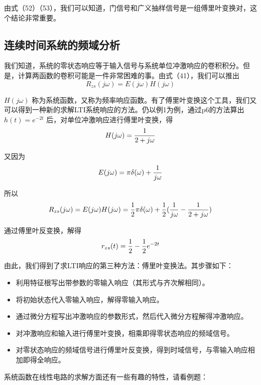 \documentclass[UTF8,a4paper,11pt]{article}
\begin{document}
由式（52）（53），我们可以知道，门信号和广义抽样信号是一组傅里叶变换对，这个结论非常重要。

\subsection{连续时间系统的频域分析}
我们知道，系统的零状态响应等于输入信号与系统单位冲激响应的卷积积分。但是，计算两函数的卷积可能是一件非常困难的事。由式（41），我们可以推出
\begin{equation}
R_{zs}(j\omega)=E(j\omega)H(j\omega)
\end{equation}

$H(j\omega)$ 称为系统函数，又称为频率响应函数。有了傅里叶变换这个工具，我们又可以得到一种新的求解LTI系统响应的方法。仍以例1为例，通过p6的方法算出 $h(t)=e^{-2t}$ 后，对单位冲激响应进行傅里叶变换，得
\begin{equation}
H(j\omega)=\frac{1}{2+j\omega}
\notag
\end{equation}

又因为
\begin{equation}
E(j\omega)=\pi\delta(\omega)+\frac{1}{j\omega}
\notag
\end{equation}

所以
\begin{equation}
R_{zs}(j\omega)=E(j\omega)H(j\omega)=\frac{1}{2}\pi\delta(\omega)+\frac{1}{2}(\frac{1}{j\omega}-\frac{1}{2+j\omega})
\notag
\end{equation}

通过傅里叶反变换，解得
\begin{equation}
r_{zs}(t)=\frac{1}{2}-\frac{1}{2}e^{-2t}
\notag
\end{equation}

由此，我们得到了求LTI响应的第三种方法：傅里叶变换法。其步骤如下：
\begin{itemize}
\item 利用特征根写出带参数的零输入响应（其形式与齐次解相同）。
\item 将初始状态代入零输入响应，解得零输入响应。
\item 通过微分方程写出冲激响应的参数形式，然后代入微分方程解得冲激响应。
\item 对冲激响应和输入进行傅里叶变换，相乘即得零状态响应的频域信号。
\item 对零状态响应的频域信号进行傅里叶反变换，得到时域信号，与零输入响应相加即得全响应。
\end{itemize} 

系统函数在线性电路的求解方面还有一些有趣的特性，请看例题：
\end{document}
